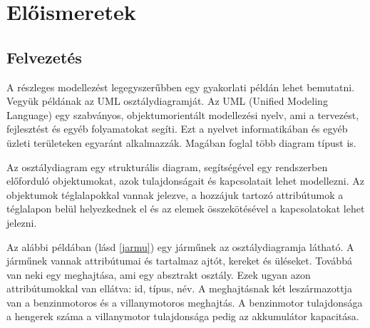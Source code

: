\chapter{Előismeretek}

\section{Felvezetés}

A részleges modellezést legegyszerűbben egy gyakorlati példán lehet bemutatni. Vegyük példának az UML \cite{UML} osztálydiagramját. Az UML (Unified Modeling Language) egy szabványos, objektumorientált modellezési nyelv, ami a tervezést, fejlesztést és egyéb folyamatokat segíti. Ezt a nyelvet informatikában és egyéb üzleti területeken egyaránt alkalmazzák. Magában foglal több diagram típust is.
\par
Az osztálydiagram egy strukturális diagram, segítségével egy rendszerben előforduló objektumokat, azok tulajdonságait és kapcsolatait lehet modellezni. Az objektumok téglalapokkal vannak jelezve, a hozzájuk tartozó attribútumok a téglalapon belül helyezkednek el és az elemek összekötésével a kapcsolatokat lehet jelezni.
\par
Az alábbi példában (lásd \autoref{jarmu}) egy járműnek az osztálydiagramja látható. A járműnek vannak attribútumai és tartalmaz ajtót, kereket és üléseket. Továbbá van neki egy meghajtása, ami egy absztrakt osztály. Ezek ugyan azon attribútumokkal van ellátva: id, típus, név. A meghajtásnak két leszármazottja van a benzinmotoros és a villanymotoros meghajtás. A benzinmotor tulajdonsága a hengerek száma a villanymotor tulajdonsága pedig az akkumulátor kapacitása.

